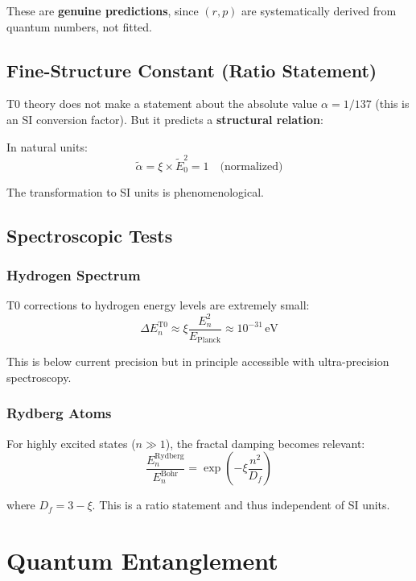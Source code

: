 These are \textbf{genuine predictions}, since $(r,p)$ are systematically derived from quantum numbers, not fitted.

\subsection{Fine-Structure Constant (Ratio Statement)}

T0 theory does not make a statement about the absolute value $\alpha = 1/137$ (this is an SI conversion factor). But it predicts a \textbf{structural relation}:

In natural units:
\begin{equation}
	\tilde{\alpha} = \xi \times \tilde{E}_0^2 = 1 \quad \text{(normalized)}
\end{equation}

The transformation to SI units is phenomenological.

\subsection{Spectroscopic Tests}

\subsubsection{Hydrogen Spectrum}

T0 corrections to hydrogen energy levels are extremely small:
\begin{equation}
	\Delta E_n^{\text{T0}} \approx \xi \frac{E_n^2}{E_{\text{Planck}}} 
	\approx 10^{-31}\,\text{eV}
\end{equation}

This is below current precision but in principle accessible with ultra-precision spectroscopy.

\subsubsection{Rydberg Atoms}

For highly excited states ($n \gg 1$), the fractal damping becomes relevant:
\begin{equation}
	\frac{E_n^{\text{Rydberg}}}{E_n^{\text{Bohr}}} = \exp\left(-\xi \frac{n^2}{D_f}\right)
\end{equation}

where $D_f = 3 - \xi$. This is a ratio statement and thus independent of SI units.

\section{Quantum Entanglement}

